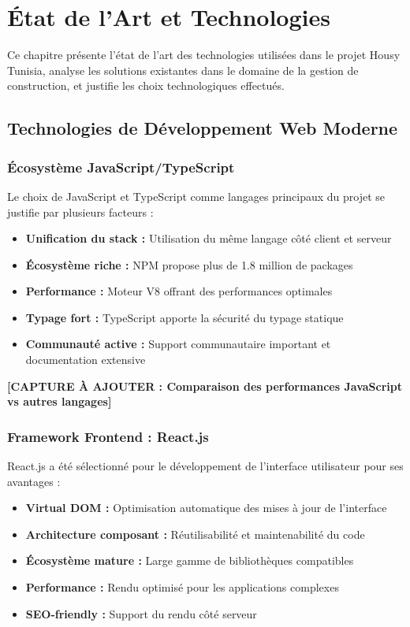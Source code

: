\chapter{État de l'Art et Technologies}

\begin{objectivebox}
Ce chapitre présente l'état de l'art des technologies utilisées dans le projet Housy Tunisia, analyse les solutions existantes dans le domaine de la gestion de construction, et justifie les choix technologiques effectués.
\end{objectivebox}

\section{Technologies de Développement Web Moderne}

\subsection{Écosystème JavaScript/TypeScript}

Le choix de JavaScript et TypeScript comme langages principaux du projet se justifie par plusieurs facteurs :

\begin{itemize}
    \item \textbf{Unification du stack :} Utilisation du même langage côté client et serveur
    \item \textbf{Écosystème riche :} NPM propose plus de 1.8 million de packages
    \item \textbf{Performance :} Moteur V8 offrant des performances optimales
    \item \textbf{Typage fort :} TypeScript apporte la sécurité du typage statique
    \item \textbf{Communauté active :} Support communautaire important et documentation extensive
\end{itemize}

\textbf{[CAPTURE À AJOUTER : Comparaison des performances JavaScript vs autres langages]}

\subsection{Framework Frontend : React.js}

React.js a été sélectionné pour le développement de l'interface utilisateur pour ses avantages :

\begin{itemize}
    \item \textbf{Virtual DOM :} Optimisation automatique des mises à jour de l'interface
    \item \textbf{Architecture composant :} Réutilisabilité et maintenabilité du code
    \item \textbf{Écosystème mature :} Large gamme de bibliothèques compatibles
    \item \textbf{Performance :} Rendu optimisé pour les applications complexes
    \item \textbf{SEO-friendly :} Support du rendu côté serveur
\end{itemize}

